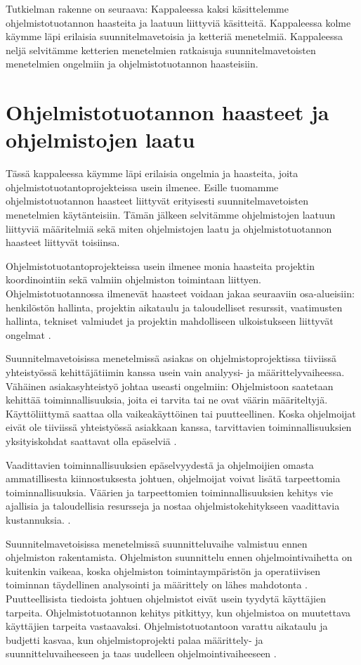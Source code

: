 \documentclass[finnish]{tktltiki2}
\theoremstyle{definition}
\theoremstyle{remark}
\begin{document}
Tutkielman rakenne on seuraava: Kappaleessa kaksi käsittelemme ohjelmistotuotannon haasteita ja laatuun liittyviä käsitteitä. Kappaleessa kolme käymme läpi erilaisia suunnitelmavetoisia ja ketteriä menetelmiä. Kappaleessa neljä selvitämme ketterien menetelmien ratkaisuja suunnitelmavetoisten menetel\-mien ongelmiin ja ohjelmistotuotannon haasteisiin. 

\section{Ohjelmistotuotannon haasteet ja ohjelmistojen laatu}

Tässä kappaleessa käymme läpi erilaisia ongelmia ja haasteita, joita ohjelmistotuotantoprojekteissa usein ilmenee. Esille tuomamme ohjelmistotuotannon haasteet liittyvät erityisesti suunnitelmavetoisten menetelmien käytänteisiin. Tämän jälkeen selvitämme ohjelmistojen laatuun liittyviä määritelmiä sekä miten ohjelmistojen laatu ja ohjelmistotuotannon haasteet liittyvät toisiinsa.

Ohjelmistotuotantoprojekteissa usein ilmenee monia haasteita projektin koordinointiin sekä valmiin ohjelmiston toimintaan liittyen. Ohjelmistotuotannossa ilmenevät haasteet voidaan jakaa seuraaviin osa-alueisiin: henkilöstön hallinta, projektin aikataulu ja taloudelliset resurssit, vaatimusten hallinta, tekniset valmiudet ja projektin mahdolliseen ulkoistukseen liittyvät ongelmat \cite{BOE88}.

Suunnitelmavetoisissa menetelmissä asiakas on ohjelmistoprojektissa tiiviissä yhteistyössä kehittäjätiimin kanssa usein vain analyysi- ja määrittely\-vaiheessa. Vähäinen asiakasyhteistyö johtaa useasti ongelmiin: Ohjelmistoon saatetaan kehittää toiminnallisuuksia, joita ei tarvita tai ne ovat väärin määriteltyjä. Käyttöliittymä saattaa olla vaikeakäyttöinen tai puutteellinen. Koska ohjelmoijat eivät ole tiiviissä yhteistyössä asiakkaan kanssa, tarvittavien toiminnallisuuksien yksityiskohdat saattavat olla epäselviä \cite{BOE88}.

Vaadittavien toiminnallisuuksien epäselvyydestä ja ohjelmoijien omasta ammatillisesta kiinnostuksesta johtuen, ohjelmoijat voivat lisätä tarpeettomia toiminnallisuuksia. Väärien ja tarpeettomien toiminnallisuuksien kehitys vie ajallisia ja taloudellisia resursseja ja nostaa ohjelmistokehitykseen vaadittavia kustannuksia. \cite{BOE88}.

Suunnitelmavetoisissa menetelmissä suunnitteluvaihe valmistuu ennen ohjelmiston rakentamista. 
Ohjelmiston suunnittelu ennen ohjelmointivaihetta on kuitenkin vaikeaa, koska ohjelmiston toimintaympäristön ja operatiivisen toiminnan täydellinen analysointi ja määrittely on lähes mahdotonta \cite{BOE88}. Puutteellisista tiedoista johtuen ohjelmistot eivät usein tyydytä käyttäjien tarpeita. Ohjelmistotuotannon kehitys pitkittyy, kun ohjelmistoa on muutettava käyttäjien tarpeita vastaavaksi. Ohjelmistotuotantoon varattu aikataulu ja budjetti kasvaa, kun ohjelmistoprojekti palaa määrittely- ja suunnitteluvaiheeseen ja taas uudelleen ohjelmointivaiheeseen \cite{BEC99}.
\end{document}
